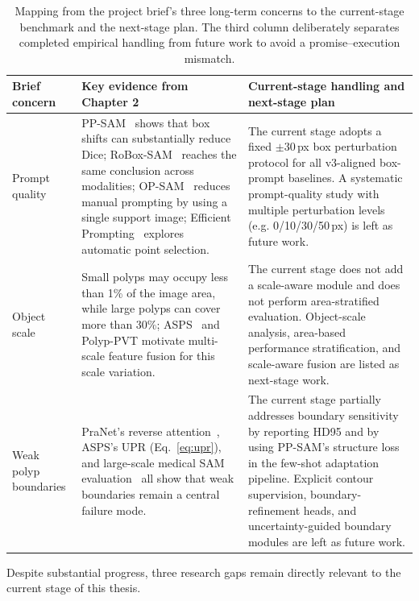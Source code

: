 \begin{table}[H]
\centering
\caption{Mapping from the project brief's three long-term concerns to the current-stage benchmark and the next-stage plan. The third column deliberately separates completed empirical handling from future work to avoid a promise--execution mismatch.}
\label{tab:brief-mapping}
\begin{tabular}{p{2.6cm}p{6.5cm}p{6.5cm}}
\toprule
\textbf{Brief concern} & \textbf{Key evidence from Chapter 2} & \textbf{Current-stage handling and next-stage plan} \\
\midrule
Prompt quality        & PP-SAM~\cite{rahman2024ppsam} shows that box shifts can substantially reduce Dice; RoBox-SAM~\cite{robustbox2024} reaches the same conclusion across modalities; OP-SAM~\cite{li2025opsam} reduces manual prompting by using a single support image; Efficient Prompting~\cite{konwer2025efficient} explores automatic point selection. & The current stage adopts a fixed $\pm30$\,px box perturbation protocol for all v3-aligned box-prompt baselines. A systematic prompt-quality study with multiple perturbation levels (e.g. 0/10/30/50\,px) is left as future work. \\
\midrule
Object scale          & Small polyps may occupy less than 1\% of the image area, while large polyps can cover more than 30\%; ASPS~\cite{li2024asps} and Polyp-PVT motivate multi-scale feature fusion for this scale variation. & The current stage does not add a scale-aware module and does not perform area-stratified evaluation. Object-scale analysis, area-based performance stratification, and scale-aware fusion are listed as next-stage work. \\
\midrule
Weak polyp boundaries & PraNet's reverse attention~\cite{fan2020pranet}, ASPS's UPR (Eq.~\ref{eq:upr}), and large-scale medical SAM evaluation~\cite{huang2024sam} all show that weak boundaries remain a central failure mode. & The current stage partially addresses boundary sensitivity by reporting HD95 and by using PP-SAM's structure loss in the few-shot adaptation pipeline. Explicit contour supervision, boundary-refinement heads, and uncertainty-guided boundary modules are left as future work. \\
\bottomrule
\end{tabular}
\end{table}

Despite substantial progress, three research gaps remain directly relevant to the current stage of this thesis.

